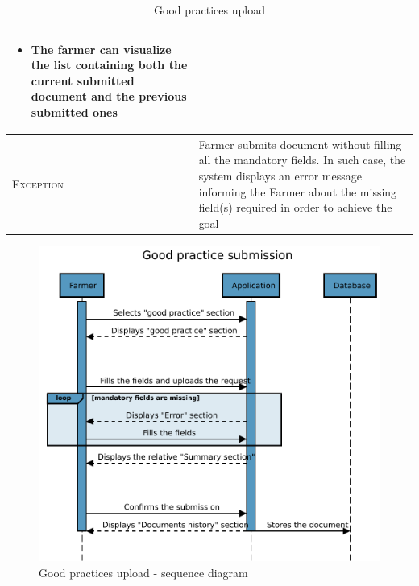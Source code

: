 \begin{table}[H]
\begin{tabular}{|l|m{}|}
\begin{itemize}
    	    \item The farmer can visualize the list containing both the current submitted document and the previous submitted ones
    	\end{itemize}\\
    	\hline %
    	\textsc{Exception}         &   Farmer submits document without filling all the mandatory fields. In such case, the system displays an error message informing the Farmer about the missing field(s) required in order to achieve the goal\\
    	\hline %
        
    \end{tabular}

\caption{\label{tab:good_practice_submission}Good practices upload}
\end{table}

\begin{figure}[H]
	\centering
    \includegraphics[page=1, width=\textwidth]{Images/SeqDiag/good_practice_seq_diag.pdf}
	\caption{\label{fig:good_practice_seq_diag}Good practices upload - sequence diagram}
\end{figure}



